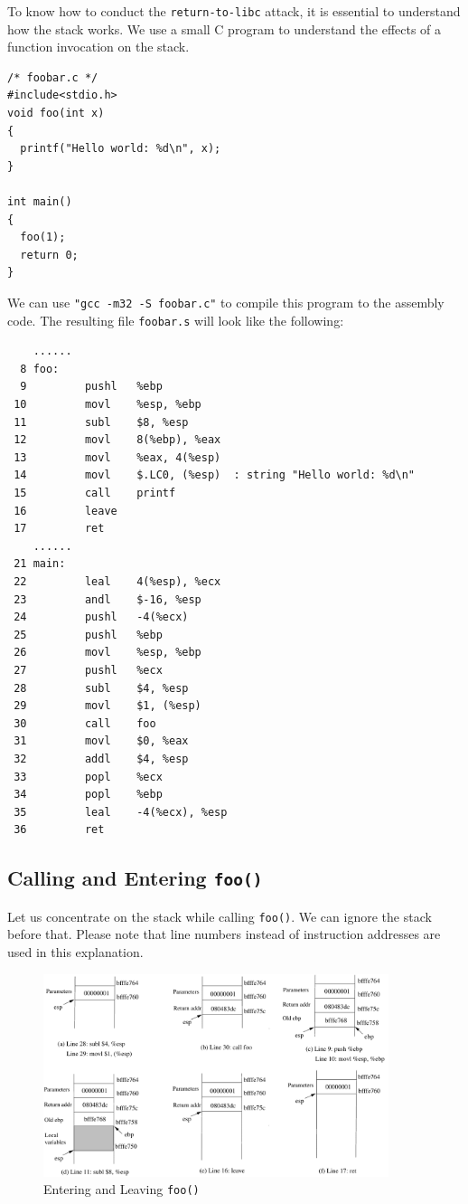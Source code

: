 To know how to conduct the {\tt return-to-libc} attack, it is essential to 
understand how the stack works.  We use a small C program to understand 
the effects of a function invocation on the stack. 
\begin{verbatim}
/* foobar.c */
#include<stdio.h>
void foo(int x)
{
  printf("Hello world: %d\n", x);
}

int main()
{
  foo(1);
  return 0;
}
\end{verbatim}
We can use {\tt "gcc -m32 -S foobar.c"} to
compile this program to the assembly code.
The resulting file {\tt foobar.s} will look like the following:
\begin{verbatim}
    ......
  8 foo:
  9         pushl   %ebp
 10         movl    %esp, %ebp
 11         subl    $8, %esp
 12         movl    8(%ebp), %eax   
 13         movl    %eax, 4(%esp)
 14         movl    $.LC0, (%esp)  : string "Hello world: %d\n"
 15         call    printf
 16         leave
 17         ret
    ......
 21 main:
 22         leal    4(%esp), %ecx
 23         andl    $-16, %esp
 24         pushl   -4(%ecx)
 25         pushl   %ebp
 26         movl    %esp, %ebp
 27         pushl   %ecx
 28         subl    $4, %esp
 29         movl    $1, (%esp)
 30         call    foo
 31         movl    $0, %eax
 32         addl    $4, %esp
 33         popl    %ecx
 34         popl    %ebp
 35         leal    -4(%ecx), %esp
 36         ret
\end{verbatim}

\subsection{Calling and Entering {\tt foo()}}

Let us concentrate on the stack while calling {\tt foo()}. We can ignore the stack
before that. Please note that line numbers instead of instruction addresses are
used in this explanation. 

\begin{figure}[H]
   \begin{center} 
   \includegraphics[width=0.9\textwidth]{Figs/enter_leave_foo.pdf}
    \end{center}
    \caption{Entering and Leaving {\tt foo()}}
    \label{fig:enter_leave_foo}
\end{figure}



